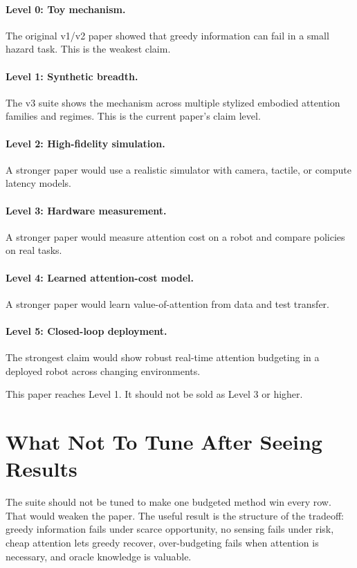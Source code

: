 \documentclass{article}
\begin{document}
\paragraph{Level 0: Toy mechanism.}
The original v1/v2 paper showed that greedy information can fail in a small
hazard task. This is the weakest claim.

\paragraph{Level 1: Synthetic breadth.}
The v3 suite shows the mechanism across multiple stylized embodied attention
families and regimes. This is the current paper's claim level.

\paragraph{Level 2: High-fidelity simulation.}
A stronger paper would use a realistic simulator with camera, tactile, or
compute latency models.

\paragraph{Level 3: Hardware measurement.}
A stronger paper would measure attention cost on a robot and compare policies
on real tasks.

\paragraph{Level 4: Learned attention-cost model.}
A stronger paper would learn value-of-attention from data and test transfer.

\paragraph{Level 5: Closed-loop deployment.}
The strongest claim would show robust real-time attention budgeting in a
deployed robot across changing environments.

This paper reaches Level 1. It should not be sold as Level 3 or higher.

\section{What Not To Tune After Seeing Results}

The suite should not be tuned to make one budgeted method win every row. That
would weaken the paper. The useful result is the structure of the tradeoff:
greedy information fails under scarce opportunity, no sensing fails under
risk, cheap attention lets greedy recover, over-budgeting fails when attention
is necessary, and oracle knowledge is valuable.
\end{document}
